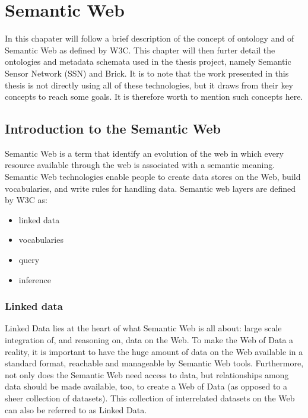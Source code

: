 \chapter{Semantic Web}
\label{ch:semantic_web}

\nocite{rdf_introduction}
In this chapater will follow a brief description of the concept of ontology and of Semantic Web as defined by W3C. This chapter will then furter detail the ontologies and metadata schemata used in the thesis project, namely Semantic Sensor Network (SSN) and Brick.
It is to note that the work presented in this thesis is not directly using all of these technologies, but it draws from their key concepts to reach some goals. It is therefore worth to mention such concepts here.

\section{Introduction to the Semantic Web}
Semantic Web is a term that identify an evolution of the web in which every resource available through the web is associated with a semantic meaning. Semantic Web technologies enable people to create data stores on the Web, build vocabularies, and write rules for handling data.
Semantic web layers are defined by W3C as:
\begin{itemize}
  \item linked data
  \item vocabularies
  \item query
  \item inference
\end{itemize}

\subsection{Linked data}
Linked Data lies at the heart of what Semantic Web is all about: large scale integration of, and reasoning on, data on the Web. To make the Web of Data a reality, it is important to have the huge amount of data on the Web available in a standard format, reachable and manageable by Semantic Web tools. Furthermore, not only does the Semantic Web need access to data, but relationships among data should be made available, too, to create a Web of Data (as opposed to a sheer collection of datasets). This collection of interrelated datasets on the Web can also be referred to as Linked Data.

